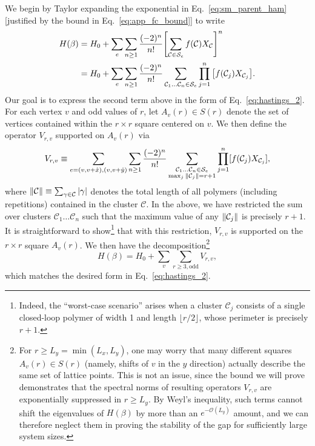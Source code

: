 We begin by Taylor expanding the exponential in Eq.~\eqref{eq:sm_parent_ham} [justified by the bound in Eq.~\eqref{eq:app_fc_bound}] to write
\begin{equation}
    \begin{split}
        H(\beta) &= H_0 + \sum_e \sum_{n \geq 1} \frac{(-2)^n}{n!} \qty[ \sum_{\mathcal{C} \in \mathcal{S}_e} f(\mathcal{C}) X_{\mathcal{C}} ]^n  \\
        &= H_0 + \sum_e \sum_{n \geq 1} \frac{(-2)^n}{n!} \sum_{\mathcal{C}_1 \ldots \mathcal{C}_n \in \mathcal{S}_e} \prod_{j = 1}^n \qty[ f(\mathcal{C}_j) X_{\mathcal{C}_j} ] .
    \end{split}
\end{equation}
Our goal is to express the second term above in the form of Eq.~\eqref{eq:hastings_2}. For each vertex $v$ and odd values of $r$, let $A_v(r) \in S(r)$ denote the set of vertices contained within the $r \times r$ square centered on $v$. We then define the operator $V_{r,v}$ supported on $A_v(r)$ via
\begin{equation}
\label{eq:V_rv_app}
    V_{r, v} \equiv \sum_{e = (v, v + \hat{x}), (v, v + \hat{y})} \sum_{n \geq 1} \frac{(-2)^n}{n!} \sum_{\substack{\mathcal{C}_1 \ldots \mathcal{C}_n \in \mathcal{S}_e \\ \max_j \norm{\mathcal{C}_j} = r+1}} \prod_{j = 1}^n [f(\mathcal{C}_j) X_{\mathcal{C}_j}] ,
\end{equation}
where $\norm{\mathcal{C}} \equiv \sum_{\gamma \in \mathcal{C}} \abs{\gamma}$ denotes the total length of all polymers (including repetitions) contained in the cluster $\mathcal{C}$. In the above, we have restricted the sum over clusters $\mathcal{C}_1 \ldots \mathcal{C}_n$ such that the maximum value of any $\norm{ \mathcal{C}_j }$ is precisely $r + 1$. It is straightforward to show\footnote{Indeed, the ``worst-case scenario'' arises when a cluster $\mathcal{C}_j$ consists of a single closed-loop polymer of width 1 and length $\lfloor r/2 \rfloor$, whose perimeter is precisely $r+1$.} that with this restriction, $V_{r, v}$ is supported on the $r \times r$ square $A_v(r)$. We then have the decomposition\footnote{For $r \geq L_y = \min(L_x, L_y)$, one may worry that many different squares $A_v(r) \in S(r)$ (namely, shifts of $v$ in the $y$ direction) actually describe the same set of lattice points. This is not an issue, since the bound we will prove demonstrates that the spectral norms of resulting operators $V_{r,v}$ are exponentially suppressed in $r \geq L_y$. By Weyl's inequality, such terms cannot shift the eigenvalues of $H(\beta)$ by more than an $e^{-\mathcal{O}(L_y)}$ amount, and we can therefore neglect them in proving the stability of the gap for sufficiently large system sizes.}
\begin{equation}
    H(\beta) = H_0 + \sum_{v} \sum_{r \geq 3, \text{odd}} V_{r, v} ,
\end{equation}
which matches the desired form in Eq.~\eqref{eq:hastings_2}.



